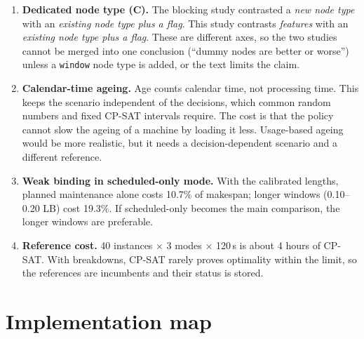 \documentclass[11pt,a4paper]{article}
\newcommand{\code}[1]{\texttt{#1}}
\begin{document}
\begin{enumerate}[nosep]
  \item \textbf{Dedicated node type (C).} The blocking study contrasted a \emph{new node type}
        with an \emph{existing node type plus a flag}. This study contrasts \emph{features} with
        an \emph{existing node type plus a flag}. These are different axes, so the two studies
        cannot be merged into one conclusion (``dummy nodes are better or worse'') unless a
        \code{window} node type is added, or the text limits the claim.
  \item \textbf{Calendar-time ageing.} Age counts calendar time, not processing time. This keeps
        the scenario independent of the decisions, which common random numbers and fixed
        CP-SAT intervals require. The cost is that the policy cannot slow the ageing of a machine
        by loading it less. Usage-based ageing would be more realistic, but it needs a
        decision-dependent scenario and a different reference.
  \item \textbf{Weak binding in scheduled-only mode.} With the calibrated lengths, planned
        maintenance alone costs 10.7\% of makespan; longer windows (0.10--0.20 LB) cost
        19.3\%. If scheduled-only becomes the main comparison, the longer windows are
        preferable.
  \item \textbf{Reference cost.} 40 instances $\times$ 3 modes $\times$ 120\,s is about 4 hours
        of CP-SAT. With breakdowns, CP-SAT rarely proves optimality within the limit, so the
        references are incumbents and their status is stored.
\end{enumerate}

\section{Implementation map}
\end{document}
